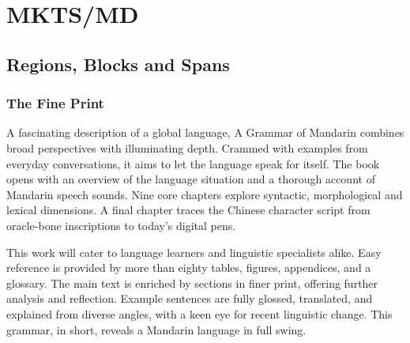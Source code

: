 
\mktsShowpar\par
\begin{multicols}{2}\mktsShowpar\par




\mktsShowpar\par
\end{multicols}
\chapter{MKTS/MD
}
\begin{multicols}{2}\end{multicols}
\section{Regions, Blocks and Spans
}
\begin{multicols}{2}
\subsection{The Fine Print
}
A fascinating description of a global language, {\mktsStyleItalic{}A Grammar of Mandarin\/} combines broad perspectives with illuminating depth. Crammed with examples from everyday conversations, it aims to let the language speak for itself. The book opens with an overview of the language situation and a thorough account of Mandarin speech sounds. Nine core chapters explore syntactic, morphological and lexical dimensions. A final chapter traces the Chinese character script from oracle-bone inscriptions to today’s digital pens.\mktsShowpar\par
This work will cater to language learners and linguistic specialists alike. Easy reference is provided by more than eighty tables, figures, appendices, and a glossary. The main text is enriched by sections in finer print, offering further analysis and reflection. Example sentences are fully glossed, translated, and explained from diverse angles, with a keen eye for recent linguistic change. This grammar, in short, reveals a Mandarin language in full swing.\mktsShowpar\par
\end{multicols}
